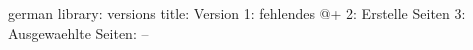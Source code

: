 \startmessages  german  library: versions
  title: Version
      1: fehlendes @+
      2: Erstelle Seiten
      3: Ausgewaehlte Seiten: --
\stopmessages

